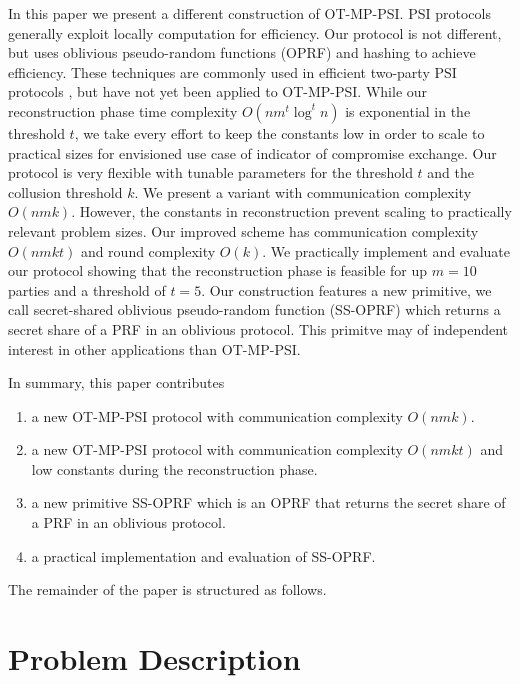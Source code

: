 \documentclass[10pt, sigconf]{acmart}
\begin{document}
In this paper we present a different construction of OT-MP-PSI.
PSI protocols generally exploit locally computation for efficiency.
Our protocol is not different, but uses oblivious pseudo-random functions (OPRF) and hashing to achieve efficiency.
These techniques are commonly used in efficient two-party PSI protocols \cite{}, but have not yet been applied to OT-MP-PSI.
While our reconstruction phase time complexity $O(n m^t \log^t n)$ is exponential in the threshold $t$, we take every effort to keep the constants low in order to scale to practical sizes for envisioned use case of indicator of compromise exchange.
Our protocol is very flexible with tunable parameters for the threshold $t$ and the collusion threshold $k$.
We present a variant with communication complexity $O(nmk)$.
However, the constants in reconstruction prevent scaling to practically relevant problem sizes.
Our improved scheme has communication complexity $O(nmkt)$ and round complexity $O(k)$.
We practically implement and evaluate our protocol showing that the reconstruction phase is feasible for up $m = 10$ parties and a threshold of $t = 5$.
Our construction features a new primitive, we call secret-shared oblivious pseudo-random function (SS-OPRF) which returns a secret share of a PRF in an oblivious protocol.
This primitve may of independent interest in other applications than OT-MP-PSI.

In summary, this paper contributes

\begin{enumerate}

\item a new OT-MP-PSI protocol with communication complexity $O(nmk)$.

\item a new OT-MP-PSI protocol with communication complexity $O(nmkt)$ and low constants during the reconstruction phase.

\item a new primitive SS-OPRF which is an OPRF that returns the secret share of a PRF in an oblivious protocol.

\item a practical implementation and evaluation of SS-OPRF.

\end{enumerate}

The remainder of the paper is structured as follows.





\section{Problem Description}
\end{document}

